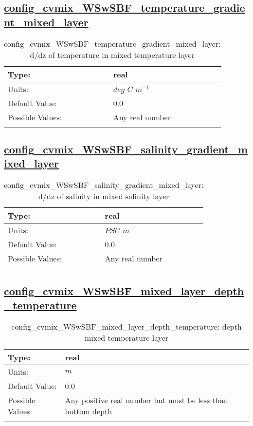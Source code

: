 \subsection[config\_cvmix\_WSwSBF\_temperature\_gradient\_mixed\_layer]{\hyperref[sec:nm_tab_cvmix_WSwSBF]{config\_cvmix\_WSwSBF\_temperature\_gradient\_mixed\_layer}}
\label{subsec:nm_sec_config_cvmix_WSwSBF_temperature_gradient_mixed_layer}
\begin{center}
\begin{longtable}{| p{2.0in} || p{4.0in} |}
    \hline
    Type: & real \\
    \hline
    Units: & $deg$ $C$ $m^{-1}$ \\
    \hline
    Default Value: & 0.0 \\
    \hline
    Possible Values: & Any real number \\
    \hline
    \caption{config\_cvmix\_WSwSBF\_temperature\_gradient\_mixed\_layer: d/dz of temperature in mixed temperature layer}
\end{longtable}
\end{center}
\subsection[config\_cvmix\_WSwSBF\_salinity\_gradient\_mixed\_layer]{\hyperref[sec:nm_tab_cvmix_WSwSBF]{config\_cvmix\_WSwSBF\_salinity\_gradient\_mixed\_layer}}
\label{subsec:nm_sec_config_cvmix_WSwSBF_salinity_gradient_mixed_layer}
\begin{center}
\begin{longtable}{| p{2.0in} || p{4.0in} |}
    \hline
    Type: & real \\
    \hline
    Units: & $PSU$ $m^{-1}$ \\
    \hline
    Default Value: & 0.0 \\
    \hline
    Possible Values: & Any real number \\
    \hline
    \caption{config\_cvmix\_WSwSBF\_salinity\_gradient\_mixed\_layer: d/dz of salinity in mixed salinity layer}
\end{longtable}
\end{center}
\subsection[config\_cvmix\_WSwSBF\_mixed\_layer\_depth\_temperature]{\hyperref[sec:nm_tab_cvmix_WSwSBF]{config\_cvmix\_WSwSBF\_mixed\_layer\_depth\_temperature}}
\label{subsec:nm_sec_config_cvmix_WSwSBF_mixed_layer_depth_temperature}
\begin{center}
\begin{longtable}{| p{2.0in} || p{4.0in} |}
    \hline
    Type: & real \\
    \hline
    Units: & $m$ \\
    \hline
    Default Value: & 0.0 \\
    \hline
    Possible Values: & Any positive real number but must be less than bottom depth \\
    \hline
    \caption{config\_cvmix\_WSwSBF\_mixed\_layer\_depth\_temperature: depth mixed temperature layer}
\end{longtable}
\end{center}
